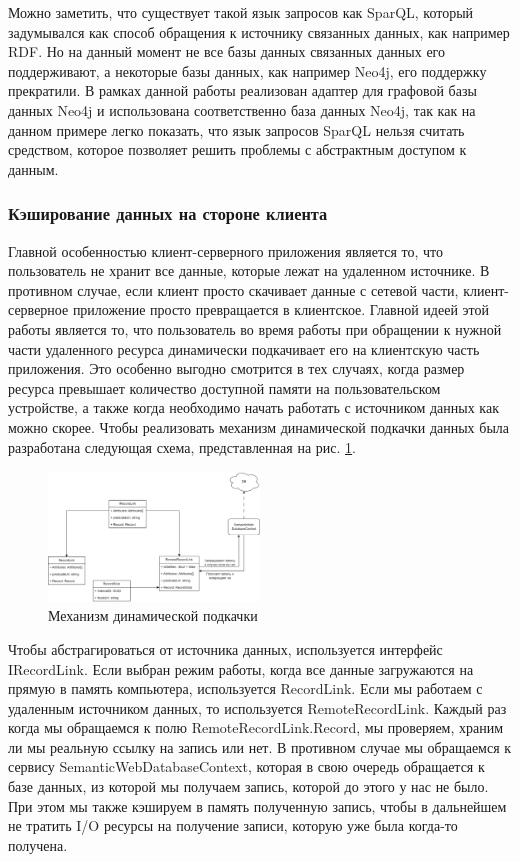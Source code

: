 \documentclass[12pt]{article}
\begin{document}
Можно заметить, что существует такой язык запросов как SparQL, который задумывался как способ обращения к источнику связанных данных, как например RDF. Но на данный момент не все базы данных связанных данных его поддерживают, а некоторые базы данных, как например Neo4j, его поддержку прекратили. В рамках данной работы реализован адаптер для графовой базы данных Neo4j и использована соответственно база данных Neo4j, так как на данном примере легко показать, что язык запросов SparQL нельзя считать средством, которое позволяет решить проблемы с абстрактным доступом к данным.

\subsubsection{Кэширование данных на стороне клиента}
\qquad Главной особенностью клиент-серверного приложения является то, что пользователь не хранит все данные, которые лежат на удаленном источнике. В противном случае, если клиент просто скачивает данные с сетевой части, клиент-серверное приложение просто превращается в клиентское. Главной идеей этой работы является то, что пользователь во время работы при обращении к нужной части удаленного ресурса динамически подкачивает его на клиентскую часть приложения. Это особенно выгодно смотрится в тех случаях, когда размер ресурса превышает количество доступной памяти на пользовательском устройстве, а также когда необходимо начать работать с источником данных как можно скорее. Чтобы реализовать механизм динамической подкачки данных была разработана следующая схема, представленная на рис. \ref{fig:remote_conn}.

\begin{figure}[!ht]
    \centering
    \includegraphics[width=0.5\textwidth]{_images/remote_conn.png}
    \caption{Механизм динамической подкачки}
    \label{fig:remote_conn}
\end{figure}

Чтобы абстрагироваться от источника данных, используется интерфейс IRecordLink. Если выбран режим работы, когда все данные загружаются на прямую в память компьютера, используется RecordLink. Если мы работаем с удаленным источником данных, то используется RemoteRecordLink. Каждый раз когда мы обращаемся к полю RemoteRecordLink.Record, мы проверяем, храним ли мы реальную ссылку на запись или нет. В противном случае мы обращаемся к сервису SemanticWebDatabaseContext, которая в свою очередь обращается к базе данных, из которой мы получаем запись, которой до этого у нас не было. При этом мы также кэшируем в память полученную запись, чтобы в дальнейшем не тратить I/O ресурсы на получение записи, которую уже была когда-то получена.
\end{document}
